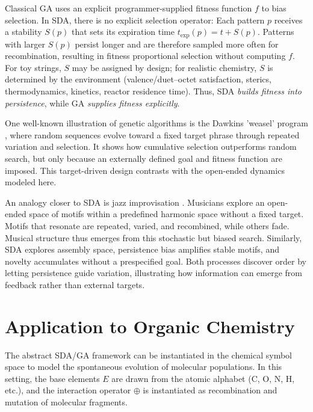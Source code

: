 \documentclass[life,article,submit,pdftex,moreauthors]{Definitions/mdpi}
\begin{document}
Classical GA uses an explicit programmer-supplied fitness function $f$ to bias selection. 
In SDA, there is no explicit selection operator: Each pattern $p$ receives a stability
$S(p)$ that sets its expiration time $t_{\exp}(p)=t+S(p)$. Patterns with larger $S(p)$ 
persist longer and are therefore sampled more often for recombination, resulting in fitness proportional selection without computing $f$. 
For toy strings, $S$ may be assigned by design; for realistic chemistry, $S$ is determined 
by the environment (valence/duet–octet satisfaction, sterics, thermodynamics, kinetics, 
reactor residence time). Thus, SDA \emph{builds fitness into persistence}, while GA
\emph{supplies fitness explicitly}.

One well-known illustration of genetic algorithms is the Dawkins 'weasel' program \cite{dawkins1986blind}, where random sequences evolve
toward a fixed target phrase through repeated variation and selection. 
It shows how cumulative selection outperforms random search, but only
because an externally defined goal and fitness function are imposed. 
This target-driven design contrasts with the open-ended dynamics modeled
here.  

An analogy closer to SDA is jazz improvisation \cite{adler2025jazz}. 
Musicians explore an open-ended space of motifs within a predefined harmonic space
without a fixed target. Motifs that resonate are repeated, varied, and recombined, while others fade. Musical structure thus emerges from this stochastic but biased search. 
Similarly, SDA explores assembly space, persistence bias amplifies
stable motifs, and novelty accumulates without a prespecified goal. 
Both processes discover order by letting persistence guide variation, 
illustrating how information can emerge from feedback rather than
external targets.


\section{Application to Organic Chemistry}

The abstract SDA/GA framework can be instantiated in the chemical symbol space to model
the spontaneous evolution of molecular populations. In this setting, the base elements
$E$ are drawn from the atomic alphabet (C, O, N, H, etc.), and the interaction operator
$\oplus$ is instantiated as recombination and mutation of molecular fragments. 
\end{document}
